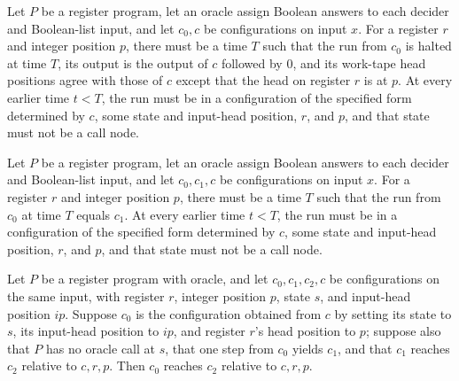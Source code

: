 \begin{definition}
\label{Complexity.LogProg.Rejects}
\leanok
{}
Let $P$ be a register program, let an oracle assign Boolean answers to each decider and
Boolean-list input, and let $c_0,c$ be configurations on input $x$. For a register $r$
and integer position $p$, there must be a time $T$ such that the run from $c_0$ is
halted at time $T$, its output is the output of $c$ followed by $0$, and its work-tape
head positions agree with those of $c$ except that the head on register $r$ is at $p$.
At every earlier time $t<T$, the run must be in a configuration of the specified form
determined by $c$, some state and input-head position, $r$, and $p$, and that state must
not be a call node.
\end{definition}

\begin{definition}
\label{Complexity.LogProg.Reaches}
\leanok
{}
Let $P$ be a register program, let an oracle assign Boolean answers to each decider and
Boolean-list input, and let $c_0,c_1,c$ be configurations on input $x$. For a register
$r$ and integer position $p$, there must be a time $T$ such that the run from $c_0$ at
time $T$ equals $c_1$. At every earlier time $t<T$, the run must be in a configuration
of the specified form determined by $c$, some state and input-head position, $r$, and
$p$, and that state must not be a call node.
\end{definition}

\begin{lemma}
\label{Complexity.LogProg.Reaches.step}
\leanok
{}
Let $P$ be a register program with oracle, and let $c_0,c_1,c_2,c$ be configurations on
the same input, with register $r$, integer position $p$, state $s$, and input-head
position $ip$. Suppose $c_0$ is the configuration obtained from $c$ by setting its state
to $s$, its input-head position to $ip$, and register $r$'s head position to $p$;
suppose also that $P$ has no oracle call at $s$, that one step from $c_0$ yields $c_1$,
and that $c_1$ reaches $c_2$ relative to $c,r,p$. Then $c_0$ reaches $c_2$ relative to
$c,r,p$.
\end{lemma}

